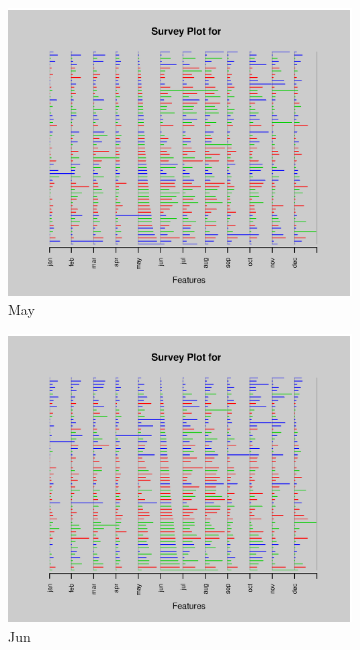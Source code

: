 \documentclass{article}
\begin{document}
\begin{enumerate}[leftmargin = 0 em, label = \arabic*., font = \bfseries]
\begin{enumerate}
\begin{enumerate}
\begin{figure}[!htb]
\begin{subfigure}[b]{0.3\textwidth}
        	\includegraphics[width = \textwidth]{3cii5.eps}
        	\caption{May}
        	\end{subfigure}%
        	\begin{subfigure}[b]{0.3\textwidth}
        	\includegraphics[width = \textwidth]{3cii6.eps}
        	\caption{Jun}
        	\end{subfigure}\\           
        	\begin{subfigure}[b]{0.3\textwidth}

\end{subfigure}
\end{figure}
\end{enumerate}
\end{enumerate}
\end{enumerate}
\end{document}
